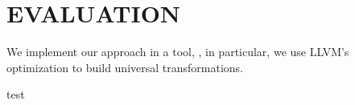 \section{EVALUATION}


We implement our approach in a tool, \tool, in particular, we use LLVM's optimization to build universal transformations.


test~\cite{even2020closer}